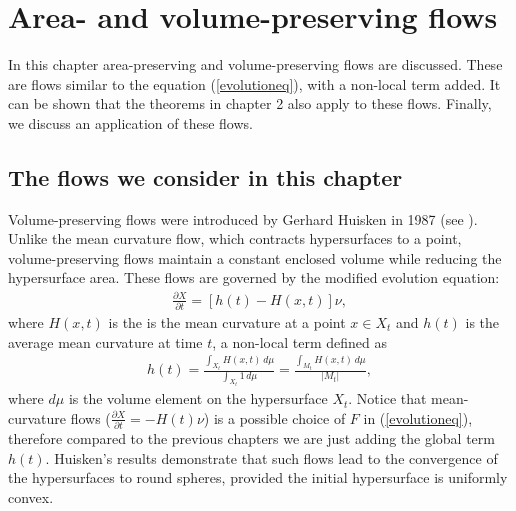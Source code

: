 \chapter{Area- and volume-preserving flows}


In this chapter area-preserving and volume-preserving flows are discussed. These are flows similar to the equation (\ref{evolutioneq}), with a non-local term added. It can be shown that the theorems in chapter 2 also apply to these flows. Finally, we discuss an application of these flows. 
\section{The flows we consider in this chapter}
Volume-preserving flows were introduced by Gerhard Huisken in 1987 (see \cite{volpres}). Unlike the mean curvature flow, which contracts hypersurfaces to a point, volume-preserving flows maintain a constant enclosed volume while reducing the hypersurface area. These flows are governed by the modified evolution equation:
\begin{align*}
	\frac{\partial X}{\partial t} = \left[h(t) - H(x, t)\right]\nu,
\end{align*}
where $ H(x, t)$ is the is the mean curvature at a point $x\in X_t$ and $h(t)$ is the average mean curvature at time $t$, a non-local term defined as 
\begin{align*}
	h(t) = \frac{\int_{X_t} H(x, t) \, d\mu}{\int_{X_t} 1 \, d\mu}= \frac{\int_{M_t} H(x, t) \, d\mu}{|M_t|},
\end{align*}
where $d\mu$ is the volume element on the hypersurface \( X_t \).
Notice that mean-curvature flows ($\frac{\partial X}{\partial t} = - H(t)\nu$) is a possible choice of $F$ in (\ref{evolutioneq}), therefore compared to the previous chapters we are just adding the global term $h(t)$. Huisken's results demonstrate that such flows lead to the convergence of the hypersurfaces to round spheres, provided the initial hypersurface is uniformly convex. 

